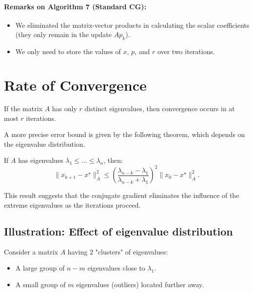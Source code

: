 \paragraph{Remarks on Algorithm 7 (Standard CG):}
\begin{itemize}
    \item We eliminated the matrix-vector products in calculating the scalar coefficients (they only remain in the update $Ap_k$).
    \item We only need to store the values of $x$, $p$, and $r$ over two iterations.
\end{itemize}

\section{Rate of Convergence}

\begin{theoreme}
If the matrix $A$ has only $r$ distinct eigenvalues, then convergence occurs in at most $r$ iterations.
\end{theoreme}

A more precise error bound is given by the following theorem, which depends on the eigenvalue distribution.

\begin{theoreme}
If $A$ has eigenvalues $\lambda_1 \le \dots \le \lambda_n$, then:
\[
\| x_{k+1} - x^\star \|_A^2 \le \left( \frac{\lambda_{n-k} - \lambda_1}{\lambda_{n-k} + \lambda_1} \right)^2 \| x_0 - x^\star \|_A^2.
\]
\end{theoreme}
This result suggests that the conjugate gradient eliminates the influence of the extreme eigenvalues as the iterations proceed.

\subsection{Illustration: Effect of eigenvalue distribution}

Consider a matrix $A$ having 2 "clusters" of eigenvalues:
\begin{itemize}
    \item A large group of $n-m$ eigenvalues close to $\lambda_1$.
    \item A small group of $m$ eigenvalues (outliers) located further away.
\end{itemize}

